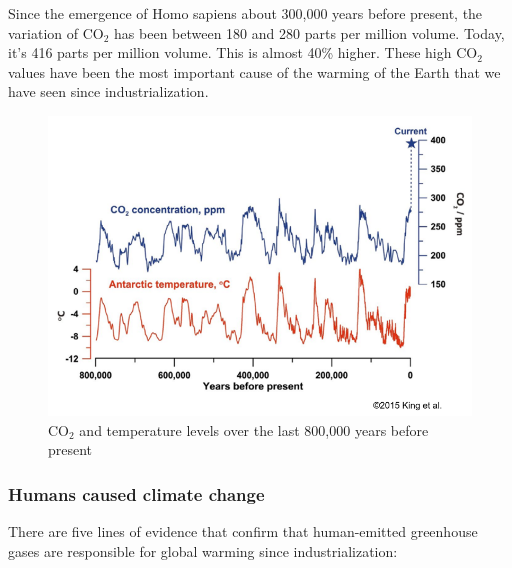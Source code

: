 \documentclass[../summary.tex]{subfiles}
\begin{document}
Since the emergence of Homo sapiens about 300,000 years before present, the variation of CO$_2$  has been between 180 and 280 parts per million volume. Today, it's 416 parts per million volume. This is almost 40\% higher. These high CO$_2$  values have been the most important cause of the warming of the Earth that we have seen since industrialization.

\begin{figure}[h]
	\centering
	\includegraphics[width=0.7\linewidth]{images/Carbon_and_temperature_800k}
	\caption{CO$_2$ and temperature levels over the last 800,000 years before present}
	\label{fig:carbonandtemperature}
\end{figure}

\subsubsection{Humans caused climate change}

There are five lines of evidence that confirm that human-emitted greenhouse gases are responsible for global warming since industrialization:
\end{document}
